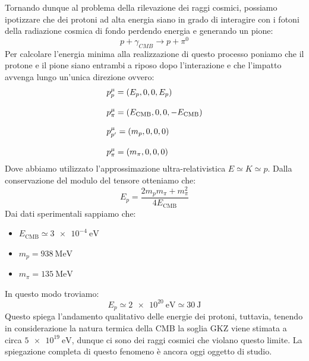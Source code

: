 Tornando dunque al problema della rilevazione dei raggi cosmici, possiamo ipotizzare che dei protoni ad alta energia siano in grado di interagire con i fotoni della radiazione cosmica di fondo perdendo energia e generando un pione:
\begin{equation}
  p + \gamma_{CMB} \rightarrow p + \pi^0
\end{equation}
Per calcolare l'energia minima alla realizzazione di questo processo poniamo che il protone e il pione siano entrambi a riposo dopo l'interazione e che l'impatto avvenga lungo un'unica direzione ovvero:
\begin{equation}
  \begin{split}
    &p_{p}^\mu = \left(E_p, 0, 0, E_p\right) \\[8pt]
    &p_{\pi}^\mu = \left(E_{\text{CMB}}, 0, 0, -E_{\text{CMB}}\right) \\[8pt]
    &p_{p'}^\mu = \left(m_{p}, 0, 0, 0\right) \\[8pt]
    &p_{\pi}^\mu = \left(m_\pi, 0, 0, 0\right)
  \end{split}
\end{equation}
Dove abbiamo utilizzato l'approssimazione ultra-relativistica $E \simeq K \simeq p$. Dalla conservazione del modulo del tensore otteniamo che:
\begin{equation}
  E_p = \dfrac{2m_p m_{\pi} + m^2_\pi}{4E_{\text{CMB}}}
\end{equation}
Dai dati sperimentali sappiamo che:
\begin{itemize}
  \item $E_{\text{CMB}} \simeq \qty{3e-4}{\electronvolt}$
  \item $m_p = \qty{938}{\mega\electronvolt}$
  \item $m_\pi = \qty{135}{\mega\electronvolt}$
\end{itemize}
In questo modo troviamo:
\begin{equation}
  E_p \simeq \qty{2e20}{\electronvolt} \simeq \qty{30}{\joule}
\end{equation}
Questo spiega l'andamento qualitativo delle energie dei protoni, tuttavia, tenendo in considerazione la natura termica della CMB la soglia GKZ viene stimata a circa $\qty{5e19}{\electronvolt}$, dunque ci sono dei raggi cosmici che violano questo limite. La spiegazione completa di questo fenomeno è ancora oggi oggetto di studio.

